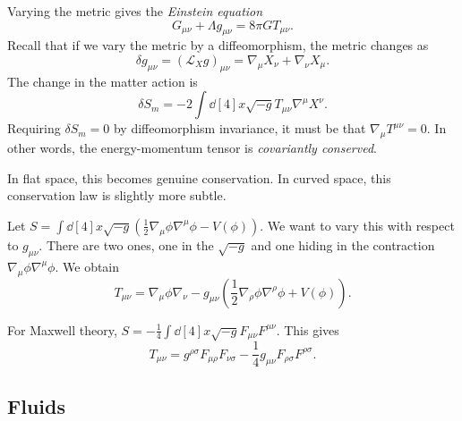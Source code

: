 Varying the metric gives the \emph{Einstein equation}
\begin{equation}
  \label{eq:einstein}
  G_{\mu\nu} + \Lambda g_{\mu\nu} = 8 \pi G T_{\mu\nu}.
\end{equation}
Recall that if we vary the metric by a diffeomorphism, the metric changes as
\begin{equation}
  \delta g_{\mu\nu} = (\mathcal{L}_X g)_{\mu\nu} = \nabla_{\mu} X_{\nu} + \nabla_{\nu} X_{\mu}.
\end{equation}
The change in the matter action is
\begin{equation}
  \delta S_m = -2 \int \dd[4]{x} \sqrt{-g} T_{\mu\nu} \nabla^{\mu} X^{\nu}.
\end{equation}
Requiring $\delta S_m = 0$ by diffeomorphism invariance, it must be that  $\nabla_{\mu} T^{\mu\nu} = 0$.
In other words, the energy-momentum tensor is \emph{covariantly conserved}.
\begin{remark}
  In flat space, this becomes genuine conservation.
  In curved space, this conservation law is slightly more subtle.
\end{remark}

\begin{example}[]
  Let $S = \int \dd[4]{x} \sqrt{-g} \left( \frac{1}{2} \nabla_{\mu} \phi \nabla^{\mu} \phi - V(\phi) \right)$. We want to vary this with respect to $g_{\mu\nu}$. There are two ones, one in the $\sqrt{-g}$ and one hiding in the contraction $\nabla_{\mu} \phi \nabla^{\mu} \phi$.
  We obtain 
  \begin{equation}
    T_{\mu\nu} = \nabla_{\mu} \phi \nabla_{\nu} - g_{\mu\nu} ( \frac{1}{2} \nabla_{\rho} \phi \nabla^{\rho} \phi + V (\phi)).
  \end{equation}
\end{example}

\begin{example}[]
  For Maxwell theory, $S = - \frac{1}{4} \int \dd[4]{x} \sqrt{-g} F_{\mu\nu} F^{\mu\nu}$. This gives
  \begin{equation}
    T_{\mu\nu} = g^{\rho\sigma} F_{\mu\rho} F_{\nu\sigma} - \frac{1}{4} g_{\mu\nu} F_{\rho\sigma} F^{\rho\sigma}.
  \end{equation}
\end{example}

\subsection{Fluids}%
\label{sub:fluids}


